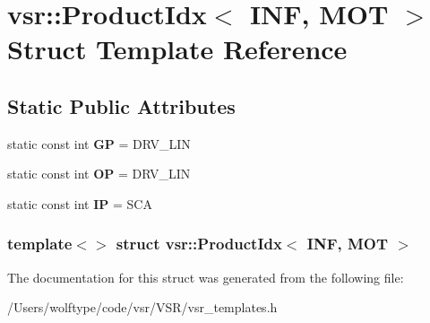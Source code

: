 \hypertarget{structvsr_1_1_product_idx_3_01_i_n_f_00_01_m_o_t_01_4}{\section{vsr\-:\-:Product\-Idx$<$ I\-N\-F, M\-O\-T $>$ Struct Template Reference}
\label{structvsr_1_1_product_idx_3_01_i_n_f_00_01_m_o_t_01_4}
}
\subsection*{Static Public Attributes}
\begin{DoxyCompactItemize}
\item 
\hypertarget{structvsr_1_1_product_idx_3_01_i_n_f_00_01_m_o_t_01_4_a493f85719b319ff0cd8d538725a13551}{static const int {\bfseries G\-P} = D\-R\-V\-\_\-\-L\-I\-N}\label{structvsr_1_1_product_idx_3_01_i_n_f_00_01_m_o_t_01_4_a493f85719b319ff0cd8d538725a13551}

\item 
\hypertarget{structvsr_1_1_product_idx_3_01_i_n_f_00_01_m_o_t_01_4_ac90f78e6614e9e4d4b7abf5605db499c}{static const int {\bfseries O\-P} = D\-R\-V\-\_\-\-L\-I\-N}\label{structvsr_1_1_product_idx_3_01_i_n_f_00_01_m_o_t_01_4_ac90f78e6614e9e4d4b7abf5605db499c}

\item 
\hypertarget{structvsr_1_1_product_idx_3_01_i_n_f_00_01_m_o_t_01_4_a0cc63a790eb2a575a006cc1c129a821c}{static const int {\bfseries I\-P} = S\-C\-A}\label{structvsr_1_1_product_idx_3_01_i_n_f_00_01_m_o_t_01_4_a0cc63a790eb2a575a006cc1c129a821c}

\end{DoxyCompactItemize}
\subsubsection*{template$<$$>$ struct vsr\-::\-Product\-Idx$<$ I\-N\-F, M\-O\-T $>$}



The documentation for this struct was generated from the following file\-:\begin{DoxyCompactItemize}
\item 
/\-Users/wolftype/code/vsr/\-V\-S\-R/vsr\-\_\-templates.\-h\end{DoxyCompactItemize}
